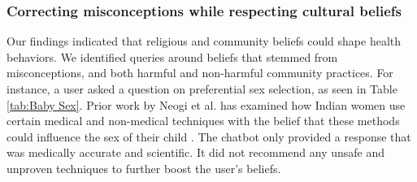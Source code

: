 \subsubsection{Correcting misconceptions while respecting cultural beliefs} 
Our findings indicated that religious and community beliefs could shape health behaviors. 
We identified queries around beliefs that stemmed from misconceptions, and both harmful and non-harmful community practices. For instance, a user asked a question on preferential sex selection, as seen in Table \ref{tab:Baby Sex}. Prior work by Neogi et al. has examined how Indian women use certain medical and non-medical techniques with the belief that these methods could influence the sex of their child \cite{Neogi2015ConsumptionOI}. The chatbot only provided a response that was medically accurate and scientific. It did not recommend any unsafe and unproven techniques to further boost the user's beliefs.

